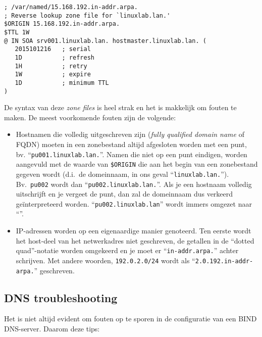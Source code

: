 \begin{verbatim}
; /var/named/15.168.192.in-addr.arpa.
; Reverse lookup zone file for `linuxlab.lan.'
$ORIGIN 15.168.192.in-addr.arpa.
$TTL 1W
@ IN SOA srv001.linuxlab.lan. hostmaster.linuxlab.lan. (
   2015101216   ; serial
   1D           ; refresh
   1H           ; retry
   1W           ; expire
   1D           ; minimum TTL
)
\end{verbatim}

De syntax van deze \emph{zone files} is heel strak en het is makkelijk om fouten te maken. De meest voorkomende fouten zijn de volgende:

\begin{itemize}
  \item Hostnamen die volledig uitgeschreven zijn (\emph{fully qualified domain name} of FQDN) moeten in een zonebestand altijd afgesloten worden met een punt, bv. ``\texttt{pu001.linuxlab.lan.}''. Namen die niet op een punt eindigen, worden aangevuld met de waarde van \texttt{\$ORIGIN} die aan het begin van een zonebestand gegeven wordt (d.i.\ de domeinnaam, in ons geval ``\texttt{linuxlab.lan.}''). Bv.\ \texttt{pu002} wordt dan ``\texttt{pu002.linuxlab.lan.}''. Als je een hostnaam volledig uitschrijft en je vergeet de punt, dan zal de domeinnaam dus verkeerd geïnterpreteerd worden. ``\texttt{pu002.linuxlab.lan}'' wordt immers omgezet naar ``''.
  
  \item IP-adressen worden op een eigenaardige manier genoteerd. Ten eerste wordt het host-deel van het netwerkadres niet geschreven, de getallen in de ``dotted quad''-notatie worden omgekeerd en je moet er ``\texttt{in-addr.arpa.}'' achter schrijven. Met andere woorden, \texttt{192.0.2.0/24} wordt als ``\texttt{2.0.192.in-addr-arpa.}'' geschreven.
\end{itemize}

\subsection{DNS troubleshooting}%
\label{ssec:dns-troubleshooting}

Het is niet altijd evident om fouten op te sporen in de configuratie van een BIND DNS-server. Daarom deze tips:

